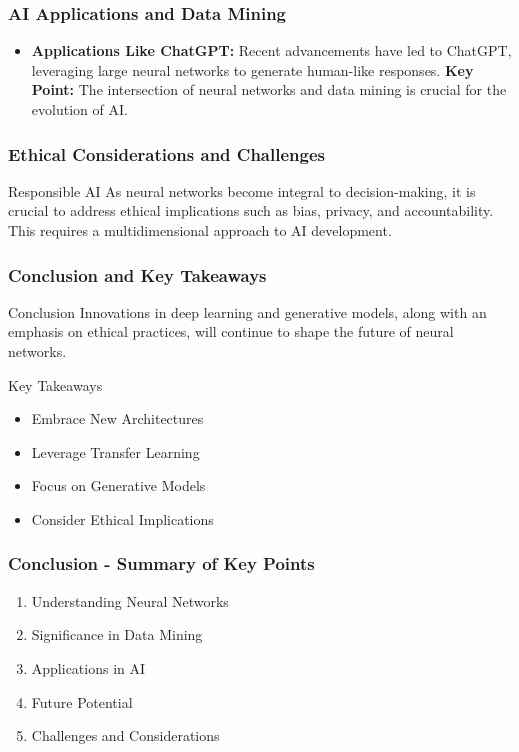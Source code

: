 \documentclass[aspectratio=169]{beamer}
\begin{document}
\begin{frame}[fragile]
    \frametitle{AI Applications and Data Mining}
    \begin{itemize}
        \item \textbf{Applications Like ChatGPT:}
            Recent advancements have led to ChatGPT, leveraging large neural networks to generate human-like responses. 
            \textbf{Key Point:} The intersection of neural networks and data mining is crucial for the evolution of AI. 

    \end{itemize}
\end{frame}

\begin{frame}[fragile]
    \frametitle{Ethical Considerations and Challenges}
    \begin{block}{Responsible AI}
        As neural networks become integral to decision-making, it is crucial to address ethical implications such as bias, privacy, and accountability. This requires a multidimensional approach to AI development.
    \end{block}
\end{frame}

\begin{frame}[fragile]
    \frametitle{Conclusion and Key Takeaways}
    \begin{block}{Conclusion}
        Innovations in deep learning and generative models, along with an emphasis on ethical practices, will continue to shape the future of neural networks.
    \end{block}
    \begin{block}{Key Takeaways}
        \begin{itemize}
            \item Embrace New Architectures
            \item Leverage Transfer Learning
            \item Focus on Generative Models
            \item Consider Ethical Implications
        \end{itemize}
    \end{block}
\end{frame}

\begin{frame}[fragile]
    \frametitle{Conclusion - Summary of Key Points}
    \begin{enumerate}
        \item Understanding Neural Networks
        \item Significance in Data Mining
        \item Applications in AI
        \item Future Potential
        \item Challenges and Considerations
    \end{enumerate}
\end{frame}
\end{document}
